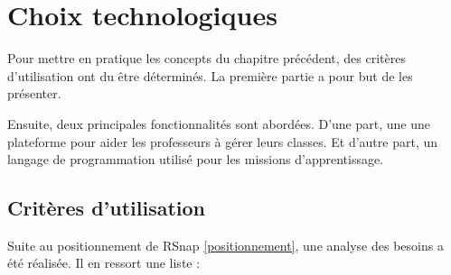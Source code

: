 \section{Choix technologiques} %
Pour mettre en pratique les concepts du chapitre précédent, des critères d'utilisation ont du être déterminés. La première partie a pour but de les présenter.

Ensuite, deux principales fonctionnalités sont abordées. %
D'une part, une une plateforme pour aider les professeurs à gérer leurs classes. Et d'autre part, un langage de programmation utilisé pour les missions d'apprentissage. 




\subsection{Critères d'utilisation} %
Suite au positionnement de RSnap \ref{positionnement}, une analyse des besoins a été réalisée. Il en ressort une liste :



